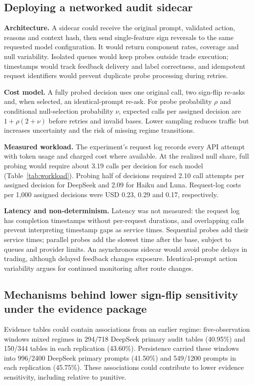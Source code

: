 \documentclass[futureinternet,article,submit,moreauthors,pdftex]{Definitions/mdpi}
\begin{document}
\subsection{Deploying a networked audit sidecar}\label{sec:network}
\noindent\textbf{Architecture.} A sidecar could receive the original prompt, validated action, reasons and context hash, then send single-feature sign reversals to the same requested model configuration. It would return component rates, coverage and null variability. Isolated queues would keep probes outside trade execution; timestamps would track feedback delivery and label correctness, and idempotent request identifiers would prevent duplicate probe processing during retries.

\noindent\textbf{Cost model.} A fully probed decision uses one original call, two sign-flip re-asks and, when selected, an identical-prompt re-ask. For probe probability $\rho$ and conditional null-selection probability $\nu$, expected calls per assigned decision are $1+\rho(2+\nu)$ before retries and invalid bases. Lower sampling reduces traffic but increases uncertainty and the risk of missing regime transitions.

\noindent\textbf{Measured workload.} The experiment's request log records every API attempt with token usage and charged cost where available. At the realized null share, full probing would require about 3.19 calls per decision for each model (Table~\ref{tab:workload}). Probing half of decisions required 2.10 call attempts per assigned decision for DeepSeek and 2.09 for Haiku and Luna. Request-log costs per 1,000 assigned decisions were USD 0.23, 0.29 and 0.17, respectively.


\noindent\textbf{Latency and non-determinism.} Latency was not measured: the request log has completion timestamps without per-request durations, and overlapping calls prevent interpreting timestamp gaps as service times. Sequential probes add their service times; parallel probes add the slowest time after the base, subject to queues and provider limits. An asynchronous sidecar would avoid probe delays in trading, although delayed feedback changes exposure. Identical-prompt action variability argues for continued monitoring after route changes.

\subsection{Mechanisms behind lower sign-flip sensitivity under the evidence package}\label{sec:mechanisms}
Evidence tables could contain associations from an earlier regime: five-observation windows mixed regimes in 294/718 DeepSeek primary audit tables (40.95\%) and 150/344 tables in each replication (43.60\%). Persistence carried these windows into 996/2400 DeepSeek primary prompts (41.50\%) and 549/1200 prompts in each replication (45.75\%). These associations could contribute to lower evidence sensitivity, including relative to punitive.
\end{document}
